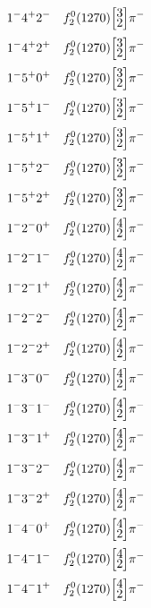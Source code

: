 \documentclass[10pt,a4paper]{article}
\def\dst{\displaystyle}
\def\vsp{\hbox{\vrule height12.5pt depth3.5pt width0pt}}
\def\ells#1#2{\Big[\hskip-5pt\vsp\begin{array}{c}\dst#1\\[-4pt]\dst#2\end{array}\vsp\hskip-5pt\Big]}
\begin{document}
\begin{align*} 
 \begin{aligned}
1^{-}4^{+}2^{-}\quad & f_2^0(1270)\ells{3}{2}\pi^-\\
1^{-}4^{+}2^{+}\quad & f_2^0(1270)\ells{3}{2}\pi^-\\
1^{-}5^{+}0^{+}\quad & f_2^0(1270)\ells{3}{2}\pi^-\\
1^{-}5^{+}1^{-}\quad & f_2^0(1270)\ells{3}{2}\pi^-\\
1^{-}5^{+}1^{+}\quad & f_2^0(1270)\ells{3}{2}\pi^-\\
1^{-}5^{+}2^{-}\quad & f_2^0(1270)\ells{3}{2}\pi^-\\
1^{-}5^{+}2^{+}\quad & f_2^0(1270)\ells{3}{2}\pi^-\\
1^{-}2^{-}0^{+}\quad & f_2^0(1270)\ells{4}{2}\pi^-\\
1^{-}2^{-}1^{-}\quad & f_2^0(1270)\ells{4}{2}\pi^-\\
1^{-}2^{-}1^{+}\quad & f_2^0(1270)\ells{4}{2}\pi^-\\
1^{-}2^{-}2^{-}\quad & f_2^0(1270)\ells{4}{2}\pi^-\\
1^{-}2^{-}2^{+}\quad & f_2^0(1270)\ells{4}{2}\pi^-\\
1^{-}3^{-}0^{-}\quad & f_2^0(1270)\ells{4}{2}\pi^-\\
1^{-}3^{-}1^{-}\quad & f_2^0(1270)\ells{4}{2}\pi^-\\
1^{-}3^{-}1^{+}\quad & f_2^0(1270)\ells{4}{2}\pi^-\\
1^{-}3^{-}2^{-}\quad & f_2^0(1270)\ells{4}{2}\pi^-\\
1^{-}3^{-}2^{+}\quad & f_2^0(1270)\ells{4}{2}\pi^-\\
1^{-}4^{-}0^{+}\quad & f_2^0(1270)\ells{4}{2}\pi^-\\
1^{-}4^{-}1^{-}\quad & f_2^0(1270)\ells{4}{2}\pi^-\\
1^{-}4^{-}1^{+}\quad & f_2^0(1270)\ells{4}{2}\pi^-\\
\end{aligned} 
 \end{align*}\pagebreak
\end{document}
